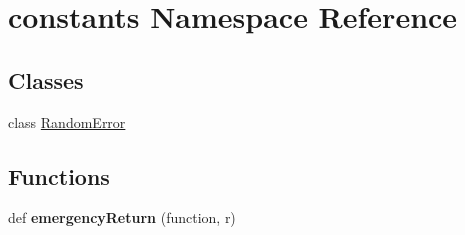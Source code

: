 \hypertarget{namespaceconstants}{}\section{constants Namespace Reference}
\label{namespaceconstants}
\subsection*{Classes}
\begin{DoxyCompactItemize}
\item 
class \hyperlink{classconstants_1_1_random_error}{Random\+Error}
\end{DoxyCompactItemize}
\subsection*{Functions}
\begin{DoxyCompactItemize}
\item 
\hypertarget{namespaceconstants_abd830a1287c41765d6fd7644c7744608}{}def {\bfseries emergency\+Return} (function, r)\label{namespaceconstants_abd830a1287c41765d6fd7644c7744608}

\end{DoxyCompactItemize}
